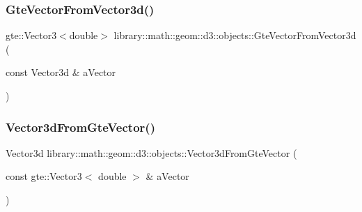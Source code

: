 \subsubsection{\texorpdfstring{Gte\+Vector\+From\+Vector3d()}{GteVectorFromVector3d()}}
{\footnotesize\ttfamily gte\+::\+Vector3$<$double$>$ library\+::math\+::geom\+::d3\+::objects\+::\+Gte\+Vector\+From\+Vector3d (\begin{DoxyParamCaption}\item[{const Vector3d \&}]{a\+Vector }\end{DoxyParamCaption})}

\mbox{\label{namespacelibrary_1_1math_1_1geom_1_1d3_1_1objects_a17fdd18d6c2bcacf17c9c1716f99609c}} 
\subsubsection{\texorpdfstring{Vector3d\+From\+Gte\+Vector()}{Vector3dFromGteVector()}}
{\footnotesize\ttfamily Vector3d library\+::math\+::geom\+::d3\+::objects\+::\+Vector3d\+From\+Gte\+Vector (\begin{DoxyParamCaption}\item[{const gte\+::\+Vector3$<$ double $>$ \&}]{a\+Vector }\end{DoxyParamCaption})}

